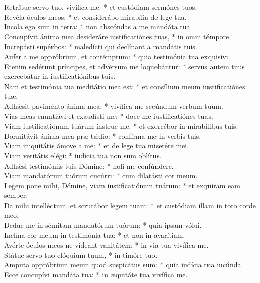 {	Retríbue servo tuo, vivífica me: * et custódiam sermónes tuos. \\
	Revéla óculos meos: * et considerábo mirabília de lege tua. \\
	Incola ego sum in terra: * non abscóndas a me mandáta tua. \\
	Concupívit ánima mea desideráre iustificatiónes tuas, * in omni témpore. \\
	Increpásti supérbos: * maledícti qui declínant a mandátis tuis. \\
	Aufer a me oppróbrium, et contémptum: * quia testimónia tua exquisívi. \\
	Etenim sedérunt príncipes, et advérsum me loquebántur: * servus autem tuus exercebátur in iustificatiónibus tuis. \\
	Nam et testimónia tua meditátio mea est: * et consílium meum iustificatiónes tuæ. \\
	Adhǽsit paviménto ánima mea: * vivífica me secúndum verbum tuum. \\
	Vias meas enuntiávi et exaudísti me: * doce me iustificatiónes tuas. \\
	Viam iustificatiónum tuárum ínstrue me: * et exercébor in mirabílibus tuis. \\
	Dormitávit ánima mea præ tǽdio: * confírma me in verbis tuis. \\
	Viam iniquitátis ámove a me: * et de lege tua miserére mei. \\
	Viam veritátis elégi: * iudícia tua non sum oblítus. \\
	Adhǽsi testimóniis tuis Dómine: * noli me confúndere. \\
	Viam mandatórum tuórum cucúrri: * cum dilatásti cor meum. \\
	Legem pone mihi, Dómine, viam iustificatiónum tuárum: * et exquíram eam semper. \\
	Da mihi intelléctum, et scrutábor legem tuam: * et custódiam illam in toto corde meo. \\
	Deduc me in sémitam mandatórum tuórum: * quia ipsam vólui. \\
	Inclína cor meum in testimónia tua: * et non in avarítiam. \\
	Avérte óculos meos ne vídeant vanitátem: * in via tua vivífica me. \\
	Státue servo tuo elóquium tuum, * in timóre tuo. \\
	Amputa oppróbrium meum quod suspicátus sum: * quia iudícia tua iucúnda. \\
	Ecce concupívi mandáta tua: * in æquitáte tua vivífica me. \\
}
